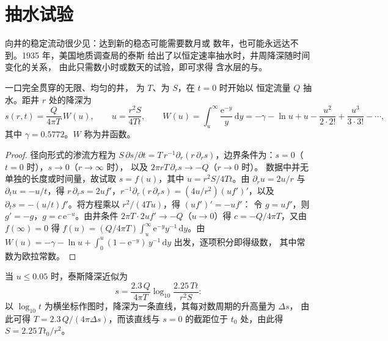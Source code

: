 \section{抽水试验}\label{sec:b3:hydrogeology:pumping}

向井的稳定流动很少见：达到新的稳态可能需要数月或
数年，也可能永远达不到。1935 年，美国地质调查局的泰斯
给出了以恒定速率抽水时，井周降深随时间变化的关系，
由此只需数小时或数天的试验，即可求得
含水层的与。

\begin{theorem}[泰斯解]\label{thm:b3:hydrogeology:theis}
一口完全贯穿的无限、均匀的井，
为 $T$、为 $S$，在 $t = 0$ 时开始以
恒定流量 $Q$ 抽水。距井 $r$ 处的降深为
\[
s(r, t) = \frac{Q}{4\pi T}\,W(u), \qquad u = \frac{r^2S}{4Tt}, \qquad
W(u) = \int_u^\infty\frac{\mathrm e^{-y}}{y}\,\mathrm dy = -\gamma - \ln u +
u - \frac{u^2}{2\cdot2!} + \frac{u^3}{3\cdot3!} - \cdots,
\]
其中 $\gamma = \num{0.5772}$。$W$ 称为井函数。
\end{theorem}

\begin{proof}
径向形式的渗流方程为 $S\,\partial s/\partial t =
T\,r^{-1}\partial_r(r\,\partial_rs)$，边界条件为：$s = 0$（$t = 0$ 时），$s \to 0$（$r \to \infty$ 时），
以及 $2\pi rT\,\partial_rs \to -Q$（$r \to 0$ 时）。
数据中并无单独的长度或时间量，故试取 $s = f(u)$，其中 $u =
r^2S/4Tt$。由 $\partial_ru = 2u/r$ 与 $\partial_tu = -u/t$，得 $r\,\partial_rs =
2uf'$，$r^{-1}\partial_r(r\,\partial_rs) = (4u/r^2)(uf')'$，以及 $\partial_ts =
-(u/t)f'$。将方程乘以 $r^2/(4Tu)$，得 $(uf')' = -uf'$：
令 $g = uf'$，则 $g' = -g$，$g = c\,\mathrm e^{-u}$。由井条件 $2\pi T\cdot2uf' \to -Q$（$u \to 0$）得 $c =
-Q/4\pi T$，又由 $f(\infty) = 0$ 得 $f(u) = (Q/4\pi T)\int_u^\infty
\mathrm e^{-y}y^{-1}\,\mathrm dy$。由
$W(u) = -\gamma - \ln u + \int_0^u(1 - \mathrm e^{-y})\,y^{-1}\,\mathrm dy$ 出发，逐项积分即得级数，
其中常数为欧拉常数。
\end{proof}

\begin{proposition}[库珀–雅各布近似]\label{prop:b3:hydrogeology:cooper-jacob}
当 $u \le 0.05$ 时，泰斯降深近似为
\[
s = \frac{2.3\,Q}{4\pi T}\log_{10}\frac{2.25\,Tt}{r^2S} :
\]
以 $\log_{10}t$ 为横坐标作图时，降深为一条直线，其每对数周期的升高量为 $\Delta s$，
由此可得 $T = 2.3\,Q/(4\pi\Delta s)$，而该直线与 $s = 0$ 的截距位于
$t_0$ 处，由此得 $S = 2.25\,Tt_0/r^2$。
\end{proposition}

